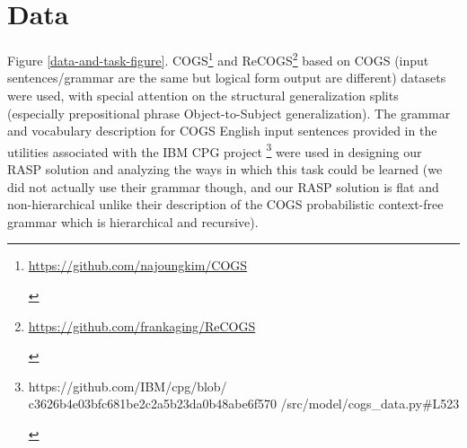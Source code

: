 \documentclass[11pt]{article}
\begin{document}
\section{Data}

Figure \ref{data-and-task-figure}.
COGS\footnote{\begin{footnotesize}\href{https://github.com/najoungkim/COGS}{https://github.com/najoungkim/COGS}\end{footnotesize}} \cite{KimLinzen2020} and ReCOGS\footnote{\begin{footnotesize}\href{https://github.com/frankaging/ReCOGS}{https://github.com/frankaging/ReCOGS}\end{footnotesize}} \cite{Wu2023} based on COGS \cite{KimLinzen2020} (input sentences/grammar are the same but logical form output are different) datasets were used, with special attention on the structural generalization splits (especially prepositional phrase Object-to-Subject generalization). The grammar and vocabulary description for COGS English input sentences provided in the utilities associated with the IBM CPG project \cite{klinger2024compositionalprogramgenerationfewshot}\footnote{\begin{footnotesize}https://github.com/IBM/cpg/blob/
c3626b4e03bfc681be2c2a5b23da0b48abe6f570
/src/model/cogs\_data.py\#L523
\end{footnotesize}}
were used in designing our RASP solution and analyzing the ways in which this task could be learned (we did not actually use their grammar though, and our RASP solution is flat and non-hierarchical unlike their description of the COGS probabilistic context-free grammar which is hierarchical and recursive).
\end{document}
